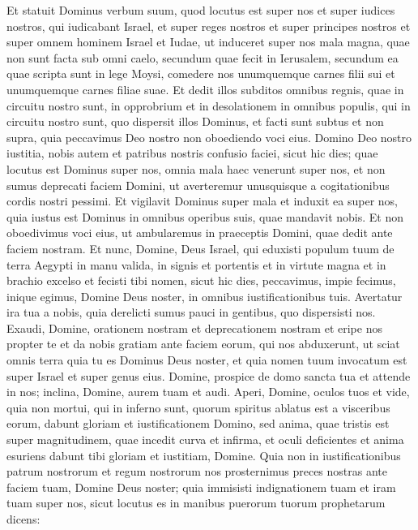 \begin{biblechapter}
\begin{biblechapter}
\verse Et statuit Dominus verbum suum, quod locutus est super nos et super iudices nostros, qui iudicabant Israel, et super reges nostros et super principes nostros et super omnem hominem Israel et Iudae, 
\verse ut induceret super nos mala magna, quae non sunt facta sub omni caelo, secundum quae fecit in Ierusalem, secundum ea quae scripta sunt in lege Moysi, 
\verse comedere nos unumquemque carnes filii sui et unumquemque carnes filiae suae. 
\verse Et dedit illos subditos omnibus regnis, quae in circuitu nostro sunt, in opprobrium et in desolationem in omnibus populis, qui in circuitu nostro sunt, quo dispersit illos Dominus, 
\verse et facti sunt subtus et non supra, quia peccavimus Deo nostro non oboediendo voci eius. 
\verse Domino Deo nostro iustitia, nobis autem et patribus nostris confusio faciei, sicut hic dies; 
\verse quae locutus est Dominus super nos, omnia mala haec venerunt super nos, 
\verse et non sumus deprecati faciem Domini, ut averteremur unusquisque a cogitationibus cordis nostri pessimi. 
\verse Et vigilavit Dominus super mala et induxit ea super nos, quia iustus est Dominus in omnibus operibus suis, quae mandavit nobis. 
\verse Et non oboedivimus voci eius, ut ambularemus in praeceptis Domini, quae dedit ante faciem nostram.
 \verse Et nunc, Domine, Deus Israel, qui eduxisti populum tuum de terra Aegypti in manu valida, in signis et portentis et in virtute magna et in brachio excelso et fecisti tibi nomen, sicut hic dies, 
\verse peccavimus, impie fecimus, inique egimus, Domine Deus noster, in omnibus iustificationibus tuis. 
\verse Avertatur ira tua a nobis, quia derelicti sumus pauci in gentibus, quo dispersisti nos. 
 \verse Exaudi, Domine, orationem nostram et deprecationem nostram et eripe nos propter te et da nobis gratiam ante faciem eorum, qui nos abduxerunt, 
\verse ut sciat omnis terra quia tu es Dominus Deus noster, et quia nomen tuum invocatum est super Israel et super genus eius. 
\verse Domine, prospice de domo sancta tua et attende in nos; inclina, Domine, aurem tuam et audi. 
\verse Aperi, Domine, oculos tuos et vide, quia non mortui, qui in inferno sunt, quorum spiritus ablatus est a visceribus eorum, dabunt gloriam et iustificationem Domino, 
\verse sed anima, quae tristis est super magnitudinem, quae incedit curva et infirma, et oculi deficientes et anima esuriens dabunt tibi gloriam et iustitiam, Domine. 
 \verse Quia non in iustificationibus patrum nostrorum et regum nostrorum nos prosternimus preces nostras ante faciem tuam, Domine Deus noster; 
\verse quia immisisti indignationem tuam et iram tuam super nos, sicut locutus es in manibus puerorum tuorum prophetarum dicens: 

\end{biblechapter}
\end{biblechapter}
